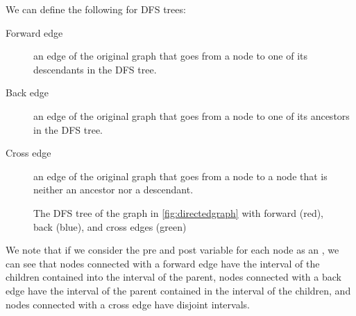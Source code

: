 \documentclass[12pt]{extarticle}
\begin{document}
We can define the following for DFS trees:

\begin{description}
    \item[Forward edge] an edge of the original graph that goes from a node to one of its descendants in the DFS tree.
    \item[Back edge] an edge of the original graph that goes from a node to one of its ancestors in the DFS tree.
    \item[Cross edge] an edge of the original graph that goes from a node to a node that is neither an ancestor nor a descendant.
\end{description}

\begin{figure}[H]
    \centering
    \caption{The DFS tree of the graph in \ref{fig:directedgraph} with forward (red), back (blue), and cross edges (green)} \label{fig:dfs-tree-fbg}
\end{figure}

We note that if we consider the pre and post variable for each node as an ,
we can see that nodes connected with a forward edge have the interval of the children contained into the interval of the parent,
nodes connected with a back edge have the interval of the parent contained in the interval of the children,
and nodes connected with a cross edge have disjoint intervals.
\end{document}
